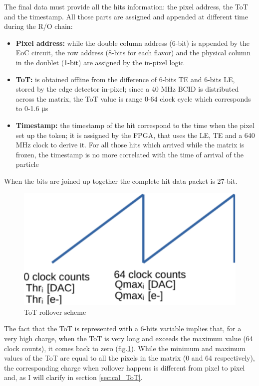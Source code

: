     The final data must provide all the hits information: the pixel address, the ToT and the timestamp. All those parts are assigned and appended at different time during the R/O chain: 
    \begin{itemize}
        \item\textbf{Pixel address:} while the double column address (6-bit) is appended by the EoC circuit, the row address (8-bits for each flavor) and the physical column in the doublet (1-bit) are assigned by the in-pixel logic      
        \item \textbf{ToT:} is obtained offline from the difference of 6-bits TE and 6-bits LE, stored by the edge detector in-pixel; since a 40 MHz BCID is distributed across the matrix, the ToT value is range 0-64 clock cycle which corresponds to 0-1.6 \si{\us}  
        \item \textbf{Timestamp:} the timestamp of the hit correspond to the time when the pixel set up the token; it is assigned by the FPGA, that uses the LE, TE and a 640 MHz clock to derive it. For all those hits which arrived while the matrix is frozen, the timestamp is no more correlated with the time of arrival of the particle         
    \end{itemize}
    When the bits are joined up together the complete hit data packet is 27-bit. 
    \begin{figure}[h!]
        \centering
        \includegraphics[width=0.35\linewidth]{figures/Monopix1/rollover.pdf}                 
        \caption{ToT rollover scheme}
        \label{fig:ToT_rollover_scheme}
    \end{figure}
    The fact that the ToT is represented with a 6-bits variable implies that, for a very high charge, when the ToT is very long and exceeds the maximum value (64 clock counts), it comes back to zero (fig.\ref{fig:ToT_rollover_scheme}). 
    While the minimum and maximum values of the ToT are equal to all the pixels in the matrix (0 and 64 respectively), the corresponding charge when rollover happens is different from pixel to pixel and, as I will clarify in section \ref{sec:cal_ToT}. 
